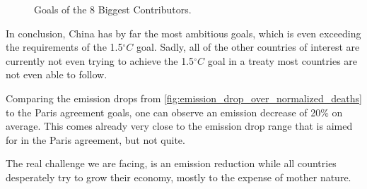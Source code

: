 \begin{figure}[H]
	\centering
	\caption{Goals of the 8 Biggest Contributors.}
	\label{fig:goals_lines}
\end{figure}

In conclusion, China has by far the most ambitious goals, which is even exceeding the requirements of the 1.5$^\circ C$ goal. Sadly, all of the other countries of interest are currently not even trying to achieve the 1.5$^\circ C$ goal in a treaty most countries are not even able to follow.

Comparing the emission drops from \autoref{fig:emission_drop_over_normalized_deaths} to the Paris agreement goals, one can observe an emission decrease of 20\% on average. This comes already very close to the emission drop range that is aimed for in the Paris agreement, but not quite.

The real challenge we are facing, is an emission reduction while all countries desperately try to grow their economy, mostly to the expense of mother nature.
